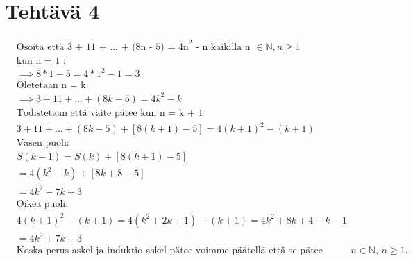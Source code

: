 \documentclass{article}
\begin{document}
	\section*{Tehtävä 4}
    \[
        \begin{aligned}
            &\text{Osoita että 3 + 11 + ... + (8n - 5) = 4n}^2 \text{ - n kaikilla n } \in \mathbb{N}, n \geq 1 \\[15pt]
            &\text{kun n = 1 :} \\
            &\implies 8 * 1 - 5 = 4 * 1^2 - 1 = 3\\[15pt]
            &\text{Oletetaan n = k} \\
            &\implies 3 + 11 + ... + (8k - 5) = 4k^2 - k\\[15pt]
            &\text{Todistetaan että väite pätee kun n = k + 1} \\
            &3 + 11 + ... + (8k - 5) + [8(k + 1) - 5] = 4(k + 1)^2 - (k + 1)\\[15pt]
            &\text{Vasen puoli:} \\
            &S(k + 1) = S(k) + [8(k + 1) - 5]\\
            &= 4(k^2 - k) + [8k + 8 - 5]\\
            &= 4k^2 - 7k + 3\\[15pt]
            &\text{Oikea puoli:} \\
            &4(k + 1)^2 - (k + 1) = 4(k^2 +2k + 1)  - (k + 1) = 4k^2 + 8k + 4 - k - 1\\
            &= 4k^2 + 7k + 3\\[15pt]
            &\text{Koska perus askel ja induktio askel pätee voimme päätellä että se pätee kaikilla $n \in \mathbb{N}$, $n \geq 1$.} \\
        \end{aligned}
    \]
\end{document}
